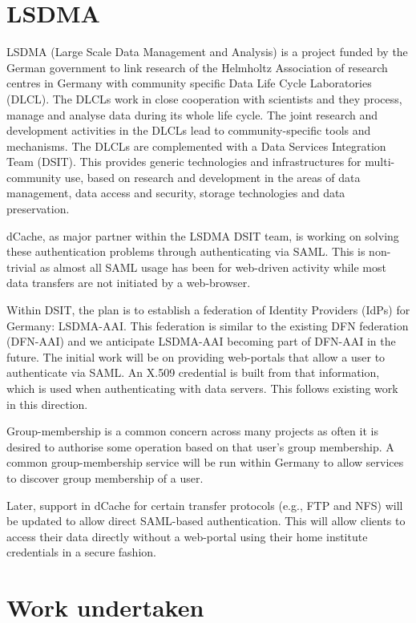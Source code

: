 \documentclass[a4paper]{jpconf}
\begin{document}
\section{LSDMA}

LSDMA\cite{lsdma} (Large Scale Data Management and Analysis) is a
project funded by the German government to link research of the
Helmholtz Association of research centres in Germany with community
specific Data Life Cycle Laboratories (DLCL). The DLCLs work in close
cooperation with scientists and they process, manage and analyse data
during its whole life cycle. The joint research and development
activities in the DLCLs lead to community-specific tools and
mechanisms. The DLCLs are complemented with a Data Services
Integration Team (DSIT). This provides generic technologies and
infrastructures for multi-community use, based on research and
development in the areas of data management, data access and security,
storage technologies and data preservation.

dCache, as major partner within the LSDMA DSIT team, is working on
solving these authentication problems through authenticating via SAML.
This is non-trivial as almost all SAML usage has been for web-driven
activity while most data transfers are not initiated by a web-browser.

Within DSIT, the plan is to establish a federation of Identity
Providers (IdPs) for Germany: LSDMA-AAI.  This federation is similar
to the existing DFN federation (DFN-AAI)\cite{dfn-aai-website} and we
anticipate LSDMA-AAI becoming part of DFN-AAI in the future.  The
initial work will be on providing web-portals that allow a user to
authenticate via SAML.  An X.509 credential is built from that
information, which is used when authenticating with data servers.
This follows existing work in this
direction\cite{groeper2007architecture}.

Group-membership is a common concern across many projects as often it
is desired to authorise some operation based on that user's group
membership.  A common group-membership service will be run within
Germany to allow services to discover group membership of a user.

Later, support in dCache for certain transfer protocols (e.g., FTP and
NFS) will be updated to allow direct SAML-based authentication.  This
will allow clients to access their data directly without a web-portal
using their home institute credentials in a secure fashion.


\section{Work undertaken}
\end{document}
